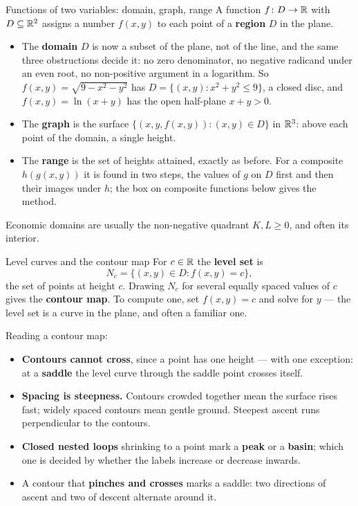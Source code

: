\begin{rulebox}{Functions of two variables: domain, graph, range}
A function $f\colon D\to\mathbb{R}$ with $D\subseteq\mathbb{R}^{2}$ assigns a number
$f(x,y)$ to each point of a \textbf{region} $D$ in the plane.
\begin{itemize}[leftmargin=1.6em,itemsep=0.3ex]
  \item The \textbf{domain} $D$ is now a subset of the plane, not of the
        line, and the same three obstructions decide it: no zero
        denominator, no negative radicand under an even root, no
        non-positive argument in a logarithm. So
        $f(x,y)=\sqrt{9-x^{2}-y^{2}}$ has $D=\{(x,y):x^{2}+y^{2}\le9\}$, a
        closed disc, and $f(x,y)=\ln(x+y)$ has the open half-plane
        $x+y>0$.
  \item The \textbf{graph} is the surface
        $\{(x,y,f(x,y)) : (x,y)\in D\}$ in $\mathbb{R}^{3}$: above each point of
        the domain, a single height.
  \item The \textbf{range} is the set of heights attained, exactly as
        before. For a composite $h(g(x,y))$ it is found in two steps, the
        values of $g$ on $D$ first and then their images under $h$; the
        box on composite functions below gives the method.
\end{itemize}
Economic domains are usually the non-negative quadrant $K,L\ge0$, and often
its interior.
\end{rulebox}

\begin{rulebox}{Level curves and the contour map}
For $c\in\mathbb{R}$ the \textbf{level set}  is
\[
  N_{c}=\{(x,y)\in D : f(x,y)=c\} ,
\]
the set of points at height $c$. Drawing $N_{c}$ for several equally spaced
values of $c$ gives the \textbf{contour map}. To compute one, set
$f(x,y)=c$ and solve for $y$ --- the level set is a curve in the plane, and
often a familiar one.

Reading a contour map:
\begin{itemize}[leftmargin=1.6em,itemsep=0.3ex]
  \item \textbf{Contours cannot cross}, since a point has one height ---
        with one exception: at a \textbf{saddle} the level curve through
        the saddle point crosses itself.
  \item \textbf{Spacing is steepness.} Contours crowded together mean the
        surface rises fast; widely spaced contours mean gentle ground.
        Steepest ascent runs perpendicular to the contours.
  \item \textbf{Closed nested loops} shrinking to a point mark a
        \textbf{peak} or a \textbf{basin}; which one is decided by whether
        the labels increase or decrease inwards.
  \item A contour that \textbf{pinches and crosses} marks a saddle: two
        directions of ascent and two of descent alternate around it.
\end{itemize}
\end{rulebox}

